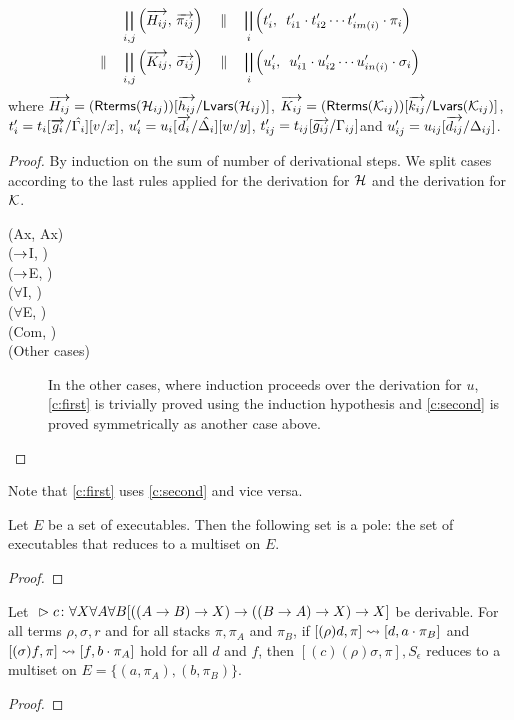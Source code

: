\begin{proposition}[Adequacy]
\begin{enumerate}[label=(\arabic{*}), ref=\textit{(\arabic{*})}]
	\begin{align*}
	       & 	 \bigparallel_{i,j}\left(\overrightarrow{H_{ij}},\,
	\overrightarrow{\pi_{ij}}\right)\quad \parallel\quad
	\bigparallel_i\left(t_i',\,\,\,t'_{i1}\cdot t'_{i2}\cdots
	t'_{im(i)}\cdot \pi_i\right)
\\
	 \parallel\quad  &
	 \bigparallel_{i,j}\left(\overrightarrow{K_{ij}},\,
	\overrightarrow{\sigma_{ij}}\right)\quad \parallel\quad
	\bigparallel_i\left(u_i',\,\,\,u'_{i1}\cdot u'_{i2}\cdots
	u'_{in(i)}\cdot \sigma_i\right)
	\end{align*}
	where
	$\overrightarrow{H_{ij}}=(\mathsf{Rterms}({\mathcal{H}_{ij}}))[\overrightarrow{h_{ij}}/\mathsf{Lvars}({\mathcal{H}_{ij}})]$,\quad
	$\overrightarrow{K_{ij}}=(\mathsf{Rterms}({\mathcal{K}_{ij}}))[\overrightarrow{k_{ij}}/\mathsf{Lvars}({\mathcal{K}_{ij}})]$,\quad
	$t'_i=t_i[\overrightarrow{g_i}/\hat{\Gamma_i}][v/x]$,\quad
	$u'_i=u_i[\overrightarrow{d_i}/\hat{\Delta_i}][w/y]$,\quad
	$t'_{ij}=t_{ij}[\overrightarrow{g_{ij}}/\Gamma_{ij}]$\quad and
	$u'_{ij}=u_{ij}[\overrightarrow{d_{ij}}/\Delta_{ij}]$\enspace.
 \end{enumerate}
\end{proposition}
\begin{proof}
 By induction on the sum of number of derivational steps.
 We split cases according to the last rules applied for the
 derivation for $\mathcal{H}$ and the derivation for $\mathcal{K}$.
 \begin{description}
  \item[(Ax, Ax)]
  \item[($\rightarrow$I, \textminus)]
  \item[($\rightarrow$E, \textminus)]
  \item[($\forall$I, \textminus)]
  \item[($\forall$E, \textminus)]
  \item[(Com, \textminus)]
  \item[(Other cases)] In the other cases,
       where induction proceeds over the derivation for $u$,
       \ref{c:first} is trivially proved using the induction
       hypothesis and \ref{c:second} is proved
       symmetrically as another case above.
 \end{description}
\end{proof}
Note that \ref{c:first} uses \ref{c:second} and vice versa.

\begin{proposition}
 Let $E$ be a set of executables.
 Then the following set is a pole: the set of executables that reduces to
 a multiset on $E$.
\end{proposition}
\begin{proof}
\end{proof}

\begin{proposition}
 Let
 ${}\vartriangleright{}{ {c} \colon{\forall X\forall A\forall B
 [((A\rightarrow B)\rightarrow X)
  \rightarrow((B\rightarrow A)\rightarrow X)
  \rightarrow X]} }$
 be
 derivable.
 For all terms $\rho,\sigma, r$ and for all stacks $\pi, \pi_A$ and
 $\pi_B$,
 if $[(\rho)d  ,\pi]\rightsquigarrow [d,a\cdot \pi_B]$ and
    $[(\sigma)f,\pi]\rightsquigarrow [f,b\cdot \pi_A]$ hold for all $d$ and $f$,
 then
 $[(c)(\rho)\sigma,\pi],S_\epsilon$ reduces to a multiset on
 $E = \{(a,\pi_A),(b,\pi_B)\}$.
\end{proposition}
\begin{proof}
\end{proof}
